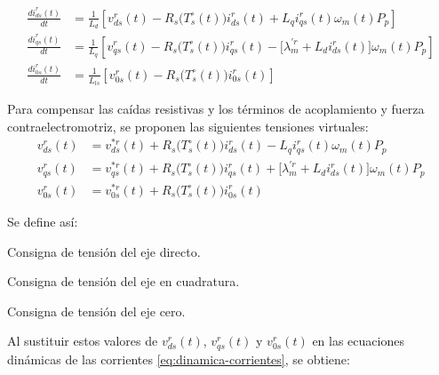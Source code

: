 \documentclass[blue,fullpaper]{ludusofficial}  %
\begin{document}
\begin{equation}
\label{eq:dinamica-corrientes}
\begin{aligned}
\frac{di_{ds}^{r}(t)}{dt} & = \frac{1}{L_{d}} \left[ v_{ds}^{r}(t) - R_{s} \Big( T_{s}^{\circ} (t) \Big) i_{ds}^{r}(t) + L_{q}i_{qs}^{r}(t) \omega_{m}(t)P_{p}  \right]  \\
\frac{di_{qs}^{r}(t)}{dt}  & = \frac{1}{L_{q} } \left[ v_{qs}^{r}(t) - R_{s} \Big( T_{s}^{\circ} (t) \Big) i_{qs}^{r}(t) - \big[ \lambda_{m}^{'r} + L_{d} i_{ds}^{r}(t) \big] \omega_{m}(t)P_{p} \right]  \\
\frac{di_{0s}^{r}(t)}{dt} & = \frac{1}{ L_{ls} } \left[ v_{0s}^{r}(t) - R_{s} \Big( T_{s}^{\circ} (t) \Big) i_{0s}^{r}(t) \right]
\end{aligned}
\end{equation}

Para compensar las caídas resistivas y los términos de acoplamiento y fuerza contraelectromotriz, se proponen las siguientes tensiones virtuales:
\begin{align}
v_{ds}^{r}(t) & = v_{ds}^{*r}(t) + R_{s} \Big( T_{s}^{\circ} (t) \Big) i_{ds}^{r}(t) - L_{q}i_{qs}^{r}(t) \omega_{m}(t)P_{p}
\label{eq:compensacion-tension-d} \\
v_{qs}^{r}(t) & = v_{qs}^{*r}(t) + R_{s} \Big( T_{s}^{\circ} (t) \Big) i_{qs}^{r}(t) + \big[ \lambda_{m}^{'r} + L_{d} i_{ds}^{r}(t) \big] \omega_{m}(t)P_{p}
\label{eq:compensacion-tension-q} \\
v_{0s}^{r}(t) & = v_{0s}^{*r}(t) + R_{s} \Big( T_{s}^{\circ} (t) \Big) i_{0s}^{r}(t)
\label{eq:compensacion-tension-cero}
\end{align}

\noindent Se define así:
\begin{description}[
    leftmargin=2.5cm,
    labelwidth=2cm,
    labelsep=0.5cm,
    align=left,
    font=\normalfont
]
    \item[$v_{ds}^{*r}(t)$] Consigna de tensión del eje directo.
    \item[$v_{qs}^{*r}(t)$] Consigna de tensión del eje en cuadratura.
    \item[$v_{0s}^{*r}(t)$] Consigna de tensión del eje cero.
\end{description}

Al sustituir estos valores de $v_{ds}^{r}(t)$, $v_{qs}^{r}(t)$ y $v_{0s}^{r}(t)$ en las ecuaciones dinámicas de las corrientes \eqref{eq:dinamica-corrientes}, se obtiene:
\end{document}
